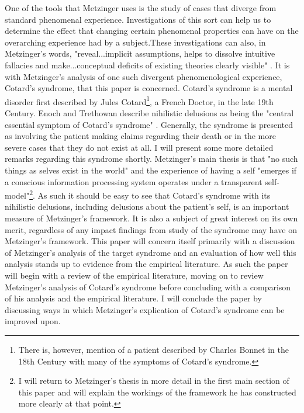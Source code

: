One of the tools that Metzinger uses is the study of cases that diverge from standard phenomenal experience. Investigations of this sort can help us to determine the effect that changing certain phenomenal properties can have on the overarching experience had by a subject.These investigations can also, in Metzinger's words, "reveal...implicit assumptions, helps to dissolve intuitive fallacies and make...conceptual deficits of existing theories clearly visible" \cite[p. 213]{metzinger2003}. It is with Metzinger's analysis of one such divergent phenomenological experience, Cotard's syndrome, that this paper is concerned.
Cotard's syndrome is a mental disorder first described by Jules Cotard\footnote{There is, however, mention of a patient described by Charles Bonnet in the 18th Century with many of the symptoms of Cotard’s syndrome\cite{forstl1992}.}, a French Doctor, in the late 19th Century. Enoch and Trethowan describe nihilistic delusions as being the "central essential symptom of Cotard's syndrome" \cite[p. 172]{enoch1991}. Generally, the syndrome is presented as involving the patient making claims regarding their death or in the more severe cases that they do not exist at all. I will present some more detailed remarks regarding this syndrome shortly.
Metzinger's main thesis is that "no such things as selves exist in the world" \cite[p. 1]{metzinger2003} and the experience of having a self "emerges if a conscious information processing system operates under a transparent self-model"\footnote{I will return to Metzinger’s thesis in more detail in the first main section of this paper and will explain the workings of the framework he has constructed more clearly at that point.}. As such it should be easy to see that Cotard's syndrome with its nihilistic delusions, including delusions about the patient's self, is an important measure of Metzinger's framework. It is also a subject of great interest on its own merit, regardless of any impact findings from study of the syndrome may have on Metzinger's framework.
This paper will concern itself primarily with a discussion of Metzinger's analysis of the target syndrome and an evaluation of how well this analysis stands up to evidence from the empirical literature. As such the paper will begin with a review of the empirical literature, moving on to review Metzinger's analysis of Cotard's syndrome before concluding with a comparison of his analysis and the empirical literature. I will conclude the paper by discussing ways in which Metzinger's explication of Cotard's syndrome can be improved upon.

